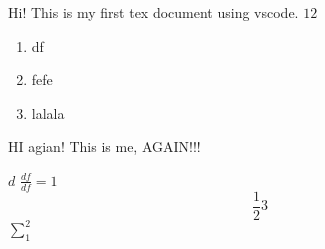 \documentclass{article}
\begin{document}
\maketitle
    Hi! This is my first tex document using vscode. 
    $12$
    \begin{enumerate}
        \item df
        \item fefe  
        \item lalala
    \end{enumerate}

    \newpage
    HI agian! This is me, AGAIN!!!

    $ d $ 
    $ \frac{df}{df} = 1  $ 
    $$ \frac{1}{2} 3 $$   
    $ \sum_{1}^{2}  $ 
\end{document}
